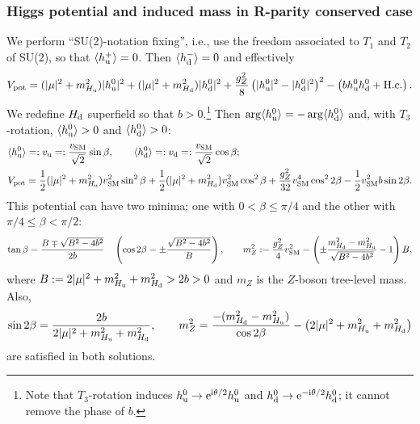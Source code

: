 \documentclass[CheatSheet]{subfiles}
\begin{document}
\subsubsection{Higgs potential and induced mass in  R-parity conserved case}
We perform ``SU(2)-notation fixing'', i.e., use the freedom associated to $T_1$ and $T_2$ of SU(2), so that $\langle h_{\mathrm{u}}^+\rangle=0$. Then $\langle h_{\mathrm{d}}^-\rangle=0$ and effectively
\begin{equation}
 V_{\mathrm{pot}}=
   (|\mu|^2 + m^2_{H_{\mathrm{u}}})  |h_{\mathrm{u}}^0|^2
 + (|\mu|^2 + m^2_{H_{\mathrm{d}}}) |h_{\mathrm{d}}^0|^2
 + \frac{g_Z^2}{8}\left(|h_{\mathrm{u}}^0|^2 - |h_{\mathrm{d}}^0|^2\right)^2
 - \left(bh_{\mathrm{u}}^0h_{\mathrm{d}}^0 +\text{H.c.}\right).
\end{equation}
We redefine $H_{\mathrm{d}}$ superfield so that $b>0$.\footnote{%
Note that $T_3$-rotation induces $h_{\mathrm{u}}^0\to\mathop{}\!\mathrm{e}^{\mathrm{i}\theta/2}h_{\mathrm{u}}^0$ and $h_{\mathrm{d}}^0\to\mathop{}\!\mathrm{e}^{-\mathrm{i}\theta/2}h_{\mathrm{d}}^0$; it cannot remove the phase of $b$.}
Then $\arg\langle h_{\mathrm{u}}^0\rangle=-\arg\langle h_{\mathrm{d}}^0\rangle$ and, with $T_3$-rotation, $\langle h_{\mathrm{u}}^0\rangle>0$ and $\langle h_{\mathrm{d}}^0\rangle>0$:
\begin{align}
 &\langle h_{\mathrm{u}}^0\rangle =: v_{\mathrm{u}} =: \frac{v_{\mathrm{SM}}}{\sqrt2}\sin\beta,\qquad
 \langle h_{\mathrm{d}}^0\rangle =: v_{\mathrm{d}} =: \frac{v_{\mathrm{SM}}}{\sqrt2}\cos\beta;
\\& V_{\mathrm{pot}}=
   \frac12(|\mu|^2 + m^2_{H_{\mathrm{u}}})  v_{\mathrm{SM}}^2\sin^2\beta
 + \frac12(|\mu|^2 + m^2_{H_{\mathrm{d}}}) v_{\mathrm{SM}}^2\cos^2\beta
 + \frac{g_Z^2}{32}v_{\mathrm{SM}}^4\cos^2 2\beta
 - \frac12 v_{\mathrm{SM}}^2 b\sin2\beta.
\end{align}
This potential can have two minima; one with $0<\beta\le\pi/4$ and the other with $\pi/4\le\beta<\pi/2$:
\begin{equation}
 \tan\beta = \frac{B\mp\sqrt{B^2-4b^2}}{2b}
\quad
\left(\cos2\beta = \pm\frac{\sqrt{B^2-4b^2}}{B}\right),
 \qquad
 m_Z^2:=\frac{g_Z^2}{4}v_{\mathrm{SM}}^2 = \left(\pm\frac{m_{H_{\mathrm{d}}}^2 - m_{H_{\mathrm{u}}}^2}{\sqrt{B^2-4b^2}}-1\right)B,
\end{equation}
where $B:=2|\mu|^2+m_{H_{\mathrm{u}}}^2+m_{H_{\mathrm{d}}}^2>2b>0$ and $m_Z$ is the $Z$-boson tree-level mass.
Also,
\begin{equation}
 \sin2\beta = \frac{2b}{2|\mu|^2 + m_{H_{\mathrm{u}}}^2 + m_{H_{\mathrm{d}}}^2},
\qquad
 m_Z^2 = \frac{-(m_{H_{\mathrm{d}}}^2 - m_{H_{\mathrm{u}}}^2)}{\cos2\beta} - \left(2|\mu|^2 + m_{H_{\mathrm{u}}}^2 + m_{H_{\mathrm{d}}}^2\right)
\end{equation}
are satisfied in both solutions.
\end{document}

